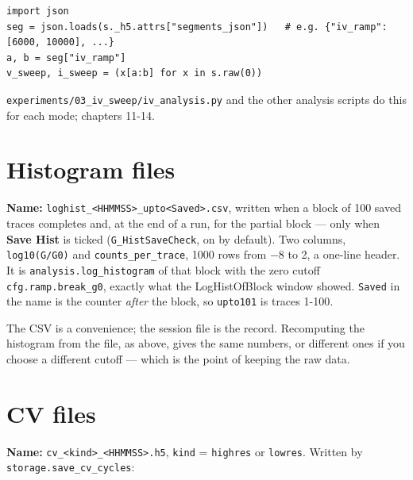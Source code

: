 \begin{lstlisting}[style=py]
import json
seg = json.loads(s._h5.attrs["segments_json"])   # e.g. {"iv_ramp": [6000, 10000], ...}
a, b = seg["iv_ramp"]
v_sweep, i_sweep = (x[a:b] for x in s.raw(0))
\end{lstlisting}

\texttt{experiments/\discretionary{}{}{}03\_\discretionary{}{}{}iv\_\discretionary{}{}{}sweep/\discretionary{}{}{}iv\_\discretionary{}{}{}analysis.\discretionary{}{}{}py} and the other analysis scripts do this for each mode; chapters 11-14.

\section{Histogram files}

\textbf{Name:} \texttt{loghist\_\discretionary{}{}{}<HHMMSS>\_\discretionary{}{}{}upto<Saved>.\discretionary{}{}{}csv}, written when a block of 100 saved traces completes and, at the end of a run, for the partial block --- only when \textbf{Save Hist} is ticked (\texttt{G\_\discretionary{}{}{}Hist\discretionary{}{}{}Save\discretionary{}{}{}Check}, on by default). Two columns, \texttt{log10(G/\discretionary{}{}{}G0)} and \texttt{counts\_\discretionary{}{}{}per\_\discretionary{}{}{}trace}, 1000 rows from −8 to 2, a one-line header. It is \texttt{analysis.\discretionary{}{}{}log\_\discretionary{}{}{}histogram} of that block with the zero cutoff \texttt{cfg.\discretionary{}{}{}ramp.\discretionary{}{}{}break\_\discretionary{}{}{}g0}, exactly what the LogHistOfBlock window showed. \texttt{Saved} in the name is the counter \emph{after} the block, so \texttt{upto101} is traces 1-100.

The CSV is a convenience; the session file is the record. Recomputing the histogram from the file, as above, gives the same numbers, or different ones if you choose a different cutoff --- which is the point of keeping the raw data.

\section{CV files}

\textbf{Name:} \texttt{cv\_\discretionary{}{}{}<kind>\_\discretionary{}{}{}<HHMMSS>.\discretionary{}{}{}h5}, \texttt{kind} = \texttt{highres} or \texttt{lowres}. Written by \texttt{storage.\discretionary{}{}{}save\_\discretionary{}{}{}cv\_\discretionary{}{}{}cycles}:

